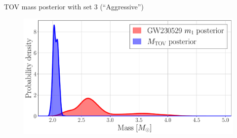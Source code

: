 \documentclass[usenames,dvipsnames,t]{beamer}
\begin{document}
\begin{frame}{TOV mass posterior with set 3 (``Aggressive'')}

  \begin{figure}
    \centering
    \includegraphics[width=0.75\linewidth]{Figures/mtov_gw230529_set_L3_pdb.pdf}
  \end{figure}

\end{frame}



\end{document}
